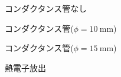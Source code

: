 \documentclass[uplatex,a4j,11pt,dvipdfmx]{jsarticle}
\newcommand{\gnu}[2]{
\begin{figure}[hptb]
\begin{center}

\caption{#1}
\label{fig:#2}
\end{center}
\end{figure}
}
\begin{document}
\gnu{コンダクタンス管なし}{graph/nopipe/all.tex}
\gnu{コンダクタンス管($\phi=10\ \si{\milli\metre}$)}{graph/thin/all.tex}
\gnu{コンダクタンス管($\phi=15\ \si{\milli\metre}$)}{graph/thick/all.tex}
\gnu{熱電子放出}{graph/thermion/all.tex}

\end{document}

